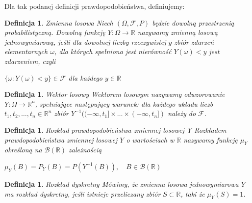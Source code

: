 \documentclass[12pt,a4paper]{report}
\newtheorem{definition}[theorem]{Definicja}
\begin{document}

Dla tak podanej definicji prawdopodobieństwa, definiujemy:

\begin{definition}{Zmienna losowa \cite[Rozdział 2.1]{krysicki1999}}
Niech $(\Omega, \mathcal{F}, P)$ będzie dowolną przestrzenią probabilistyczną. Dowolną funkcję $\textit{Y} : \Omega \rightarrow \mathbb{R}$ nazywamy zmienną losową jednowymiarową, jeśli dla dowolnej liczby rzeczywistej $y$ zbiór zdarzeń elementarnych $\omega$, dla których spełniona jest nierówność $Y(\omega)< y$ jest zdarzeniem, czyli 

$\{\omega: Y(\omega) < y \} \in \mathcal{F}$ dla każdego $y \in \mathbb{R}$

\end{definition}


\begin{definition}{Wektor losowy \cite[Rozdział 5.1]{jakubowski2004}}
Wektorem losowym nazywamy odwzorowanie $Y:\Omega \rightarrow \mathbb{R}^n$, spełniające następujący warunek: dla każdego układu liczb $t_1,t_2,\ldots,t_n \in \mathbb{R}^n$ zbiór $Y^{-1}((-\infty,t_1]\times \ldots \times(-\infty,t_n])$ należy do $\mathcal{F}$.
\end{definition}


\begin{definition}{Rozkład prawdopodobieństwa zmiennej losowej Y \cite[Rozdział 5.1]{jakubowski2004}}
Rozkładem prawdopodobieństwa zmiennej losowej $Y$ o wartościach w $\mathbb{R}$ nazywamy funkcję $\mu_Y$ określoną na $\mathcal{B}(\mathbb{R})$ zależnością

$\mu_Y(B)=P_Y(B)=P(Y^{-1}(B)), \quad B \in \mathcal{B}(\mathbb{R})$
 
\end{definition}


\begin{definition}{Rozkład dyskretny \cite[Rozdział 5.1]{jakubowski2004}}
Mówimy, że zmienna losowa jednowymiarowa $Y$ ma rozkład dyskretny, jeśli istnieje przeliczany zbiór $S \subset \mathbb{R}$, taki że $\mu_Y(S)=1$.
\end{definition}
\end{document}
